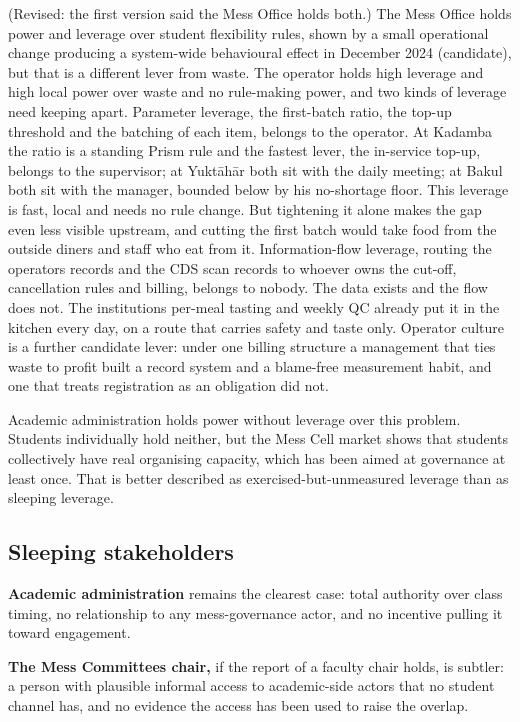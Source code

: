 \documentclass[
  10pt,
  table]{article}
\begin{document}
(Revised: the first version said the Mess Office holds both.) The Mess Office holds power and leverage over student flexibility rules, shown by a small operational change producing a system-wide behavioural effect in December 2024 (candidate), but that is a different lever from waste. The operator holds high leverage and high local power over waste and no rule-making power, and two kinds of leverage need keeping apart. Parameter leverage, the first-batch ratio, the top-up threshold and the batching of each item, belongs to the operator. At Kadamba the ratio is a standing Prism rule and the fastest lever, the in-service top-up, belongs to the supervisor; at Yuktāhār both sit with the daily meeting; at Bakul both sit with the manager, bounded below by his no-shortage floor. This leverage is fast, local and needs no rule change. But tightening it alone makes the gap even less visible upstream, and cutting the first batch would take food from the outside diners and staff who eat from it. Information-flow leverage, routing the operator\textquotesingle s records and the CDS scan records to whoever owns the cut-off, cancellation rules and billing, belongs to nobody. The data exists and the flow does not. The institution\textquotesingle s per-meal tasting and weekly QC already put it in the kitchen every day, on a route that carries safety and taste only. Operator culture is a further candidate lever: under one billing structure a management that ties waste to profit built a record system and a blame-free measurement habit, and one that treats registration as an obligation did not.

Academic administration holds power without leverage over this problem. Students individually hold neither, but the Mess Cell market shows that students collectively have real organising capacity, which has been aimed at governance at least once. That is better described as exercised-but-unmeasured leverage than as sleeping leverage.

\subsection{Sleeping stakeholders}\label{sleeping-stakeholders}

\textbf{Academic administration} remains the clearest case: total authority over class timing, no relationship to any mess-governance actor, and no incentive pulling it toward engagement.

\textbf{The Mess Committee\textquotesingle s chair,} if the report of a faculty chair holds, is subtler: a person with plausible informal access to academic-side actors that no student channel has, and no evidence the access has been used to raise the overlap.
\end{document}
